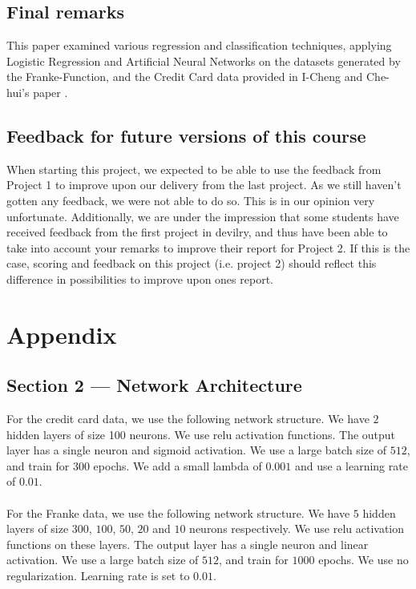 \documentclass[10pt, a4paper, twocolumn]{article}
\begin{document}
	\subsection{Final remarks}
		This paper examined various regression and classification techniques, applying Logistic Regression and Artificial Neural Networks on the datasets generated by the Franke-Function, and the Credit Card data provided in I-Cheng and Che-hui's paper \cite{ScientificArticle}. 
		
	\subsection{Feedback for future versions of this course}
		When starting this project, we expected to be able to use the feedback from Project 1 to improve upon our delivery from the last project. As we still haven't gotten any feedback, we were not able to do so. This is in our opinion very unfortunate. Additionally, we are under the impression that some students have received feedback from the first project in devilry, and thus have been able to take into account your remarks to improve their report for Project 2. If this is the case, scoring and feedback on this project (i.e. project 2) should reflect this difference in possibilities to improve upon ones report.
		
\onecolumn
\section{Appendix}
	\subsection{Section 2 --- Network Architecture}
		For the credit card data, we use the following network structure. We have $2$ hidden layers of size 100 neurons. We use relu activation functions. The output layer has a single neuron and sigmoid activation. We use a large batch size of $512$, and train for $300$ epochs. We add a small lambda of  $0.001$ and use a learning rate of $0.01$.\\\\ 
		
		For the Franke data, we use the following network structure. We have $5$ hidden layers of size $300$, $100$, $50$, $20$ and $10$ neurons respectively. We use relu activation functions on these layers. The output layer has a single neuron and linear activation. We use a large batch size of $512$, and train for $1000$ epochs. We use no regularization. Learning rate is set to $0.01$. 
\end{document}

